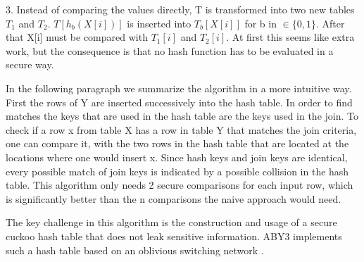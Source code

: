 3. Instead of comparing the values directly, T is transformed into two new tables $T_1$ and $T_2$. $T[h_b(X[i])]$ is inserted into $T_b[X[i]]$ for b in $ \in  \{ 0,1 \} $. After that X[i] must be compared with $T_1[i]$ and $T_2[i]$. At first this seems like extra work, but the consequence is that no hash function has to be evaluated in a secure way. 


In the following paragraph we summarize the algorithm in a more intuitive way. First the rows of Y are inserted successively into the hash table. In order to find matches the keys that are used in the hash table are the keys used in the join. To check if a row x from table X has a row in table Y that matches the join criteria, one can compare it, with the two rows in the hash table that are located at the locations where one would insert x. Since hash keys and join keys are identical, every possible match of join keys is indicated by a possible collision in the hash table.
This algorithm only needs 2 secure comparisons for each input row, which is significantly better than the n comparisons the naive approach would need.


The key challenge in this algorithm is the construction and usage of a secure cuckoo hash table that does not leak sensitive information. ABY3 implements such a hash table based on an oblivious switching network \cite{mohassel2020fast}. 










\




